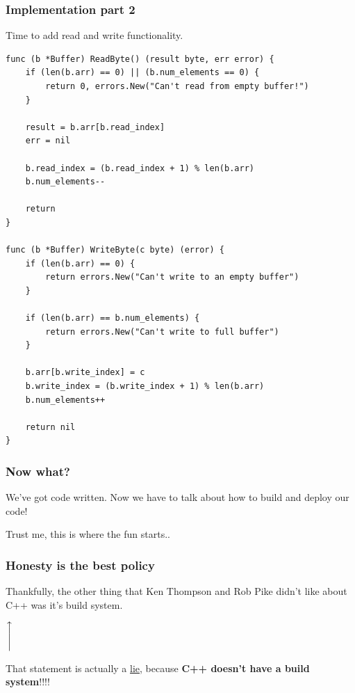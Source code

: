 \documentclass{beamer}
\begin{document}
\begin{frame}[fragile]
\frametitle{Implementation part 2}
Time to add read and write functionality. 


\begin{lstlisting}
func (b *Buffer) ReadByte() (result byte, err error) {
	if (len(b.arr) == 0) || (b.num_elements == 0) {
		return 0, errors.New("Can't read from empty buffer!")
	}

	result = b.arr[b.read_index]
	err = nil

	b.read_index = (b.read_index + 1) % len(b.arr)
	b.num_elements--

	return
}

func (b *Buffer) WriteByte(c byte) (error) {
	if (len(b.arr) == 0) {
		return errors.New("Can't write to an empty buffer")
	}

	if (len(b.arr) == b.num_elements) {
		return errors.New("Can't write to full buffer")
	}

	b.arr[b.write_index] = c
	b.write_index = (b.write_index + 1) % len(b.arr)
	b.num_elements++

	return nil
}
\end{lstlisting}
\end{frame}


\begin{frame}
\frametitle{Now what?}
We've got code written. Now we have to talk about how to build and deploy our code!

\vspace{2cm}

Trust me, this is where the fun starts..
\end{frame}


\begin{frame}
\frametitle{Honesty is the best policy}
Thankfully, the other thing that Ken Thompson and Rob Pike didn't like about C++ was it's build system.

\begin{center}
$
\Bigg\uparrow
$
\end{center}

That statement is actually a \underline{lie}, because \textbf{C++ doesn't have a build system}!!!!
\end{frame}
\end{document}
